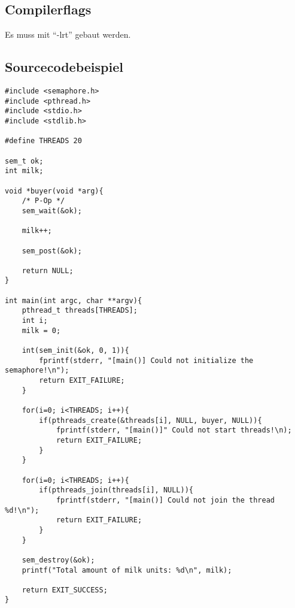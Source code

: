 \documentclass[11pt,a4paper]{article}
\begin{document}
\subsection{Compilerflags}
Es muss mit ``-lrt'' gebaut werden.

\subsection{Sourcecodebeispiel}
\begin{lstlisting}
#include <semaphore.h>
#include <pthread.h>
#include <stdio.h>
#include <stdlib.h>

#define THREADS 20

sem_t ok;
int milk;

void *buyer(void *arg){
	/* P-Op */
	sem_wait(&ok);
	
	milk++;
	
	sem_post(&ok);
	
	return NULL;
}

int main(int argc, char **argv){
	pthread_t threads[THREADS];
	int i;
	milk = 0;
	
	int(sem_init(&ok, 0, 1)){
		fprintf(stderr, "[main()] Could not initialize the semaphore!\n");
		return EXIT_FAILURE;
	}
	
	for(i=0; i<THREADS; i++){
		if(pthreads_create(&threads[i], NULL, buyer, NULL)){
			fprintf(stderr, "[main()]" Could not start threads!\n);
			return EXIT_FAILURE;
		}
	}
	
	for(i=0; i<THREADS; i++){
		if(pthreads_join(threads[i], NULL)){
			fprintf(stderr, "[main()] Could not join the thread %d!\n");
			return EXIT_FAILURE;
		}
	}
	
	sem_destroy(&ok);
	printf("Total amount of milk units: %d\n", milk);
	
	return EXIT_SUCCESS;
}
\end{lstlisting}
\end{document}
